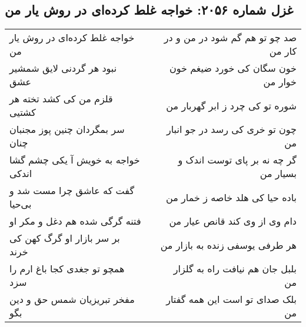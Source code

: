 \begin{center}
\section*{غزل شماره ۲۰۵۶: خواجه غلط کرده‌ای در روش یار من}
\label{sec:2056}
\begin{longtable}{l p{0.5cm} r}
خواجه غلط کرده‌ای در روش یار من
&&
صد چو تو هم گم شود در من و در کار من
\\
نبود هر گردنی لایق شمشیر عشق
&&
خون سگان کی خورد ضیغم خون خوار من
\\
قلزم من کی کشد تخته هر کشتیی
&&
شوره تو کی چرد ز ابر گهربار من
\\
سر بمگردان چنین پوز مجنبان چنان
&&
چون تو خری کی رسد در جو انبار من
\\
خواجه به خویش آ یکی چشم گشا اندکی
&&
گر چه نه بر پای توست اندک و بسیار من
\\
گفت که عاشق چرا مست شد و بی‌حیا
&&
باده حیا کی هلد خاصه ز خمار من
\\
فتنه گرگی شده هم دغل و مکر او
&&
دام وی از وی کند قانص عیار من
\\
بر سر بازار او گرگ کهن کی خرند
&&
هر طرفی یوسفی زنده به بازار من
\\
همچو تو جغدی کجا باغ ارم را سزد
&&
بلبل جان هم نیافت راه به گلزار من
\\
مفخر تبریزیان شمس حق و دین بگو
&&
بلک صدای تو است این همه گفتار من
\\
\end{longtable}
\end{center}
